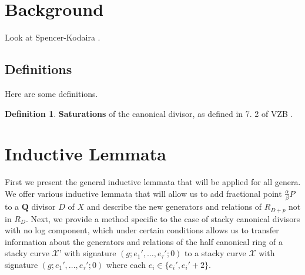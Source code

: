 \documentclass{amsart}
\theoremstyle{plain}
\theoremstyle{definition}
\newtheorem{defn}[thm]{Definition}
\theoremstyle{remark}
\numberwithin{equation}{section}
\newcommand \sx{\mathscr X}
\begin{document}


\section{Background}
\label{sec:background}
Look at Spencer-Kodaira \cite{kodaira:complex-manifolds}.

\subsection{Definitions}
Here are some definitions.

\begin{defn}
\label{defn:sat}
\textbf{Saturations} of the canonical divisor, as defined in 7.
2 of VZB \cite{vzb:stacky}.
\end{defn}




\section{Inductive Lemmata}
\label{sec:induction}
First we present the general inductive lemmata that will be applied
for all genera.  We offer various inductive lemmata that will allow us to add fractional point $\frac{\alpha}{\beta}P$ to a $\mathbf{Q}$ divisor $D$ of $X$ and describe the new generators and relations of $R_{D+p}$ not in $R_D$.  Next, we provide a method specific to the case of stacky canonical divisors with no log component, which under certain conditions allows us to transfer information about the generators and relations of the half canonical ring of a stacky curve $\sx$' with signature $(g; e_1', \ldots, e_\tau'; 0)$ to a stacky curve $\sx$ with signature $(g; e_1', \ldots, e_\tau'; 0)$ where each $e_i\in \{e_i', e_i'+2\}$.    
\end{document}
